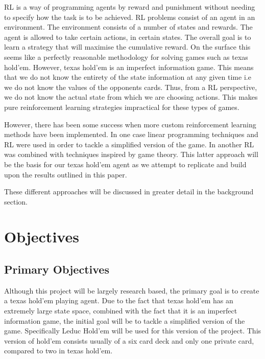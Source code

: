 RL is a way of programming agents by reward and punishment without needing to specify how the
task is to be achieved\citep{kaelbling1996reinforcement}.
RL problems consist of an agent in an environment.
The environment consists of a number of states and rewards.
The agent is allowed to take certain actions, in certain states.
The overall goal is to learn a strategy that will maximise the cumulative reward.
On the surface this seems like a perfectly reasonable methodology for solving games such as texas hold'em.
However, texas hold'em is an imperfect information game.
This means that we do not know the entirety of the state information at any given time
i.e we do not know the values of the opponents cards.
Thus, from a RL perspective, we do not know the actual state from which we are choosing actions.
This makes pure reinforcement learning strategies impractical for these types of games.

However, there has been some success when more custom reinforcement learning methods have been implemented.
In one case linear programming techniques and RL were used in order to tackle a
simplified version of the game\citep{dahl2001reinforcement}.
In another RL was combined with techniques inspired by game theory\citep{heinrich2015fictitious}.
This latter approach will be the basis for our texas hold'em agent as we attempt to replicate and
build upon the results outlined in this paper.

These different approaches will be discussed in greater detail in the background section.

\section{Objectives}\label{sec:objectives}
\subsection{Primary Objectives}\label{subsec:primaryObjectives}

Although this project will be largely research based, the primary goal is to create a texas hold'em
playing agent.
Due to the fact that texas hold'em has an extremely large state space, combined with the fact that it
is an imperfect information game, the initial goal will be to tackle a simplified version of the game.
Specifically Leduc Hold'em will be used for this version of the project.
This version of hold'em consists usually of a six card deck and only one private card, compared to two in texas hold'em.

